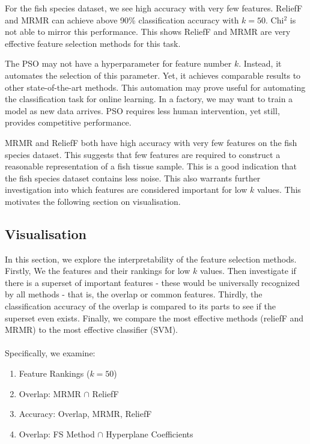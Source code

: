 \documentclass[runningheads]{llncs}
\begin{document}
For the fish species dataset, we see high accuracy with very few features.
ReliefF and MRMR can achieve above 90\% classification accuracy with $k = 50$.
Chi$^2$ is not able to mirror this performance.
This shows ReliefF and MRMR are very effective feature selection methods for this task.

The PSO may not have a hyperparameter for feature number $k$.
Instead, it automates the selection of this parameter.
Yet, it achieves comparable results to other state-of-the-art methods.
This automation may prove useful for automating the classification task for online learning.
In a factory, we may want to train a model as new data arrives.
PSO requires less human intervention, yet still, provides competitive performance.

MRMR and ReliefF both have high accuracy with very few features on the fish species dataset.
This suggests that few features are required to construct a reasonable representation of a fish tissue sample.
This is a good indication that the fish species dataset contains less noise.
This also warrants further investigation into which features are considered important for low $k$ values.
This motivates the following section on visualisation.

\subsection{Visualisation}
\label{sec:results-visualisation}

In this section, we explore the interpretability of the feature selection methods.
Firstly, We the features and their rankings for low $k$ values.
Then investigate if there is a superset of important features - these would be universally recognized by all methods - that is, the overlap or common features.
Thirdly, the classification accuracy of the overlap is compared to its parts to see if the superset even exists.
Finally, we compare the most effective methods (reliefF and MRMR) to the most effective classifier (SVM).
\\\\
Specifically, we examine:

\begin{enumerate}
  \item Feature Rankings ($k = 50$)
  \item Overlap: MRMR $\cap$ ReliefF
  \item Accuracy: Overlap, MRMR, ReliefF
  \item Overlap: FS Method $\cap$ Hyperplane Coefficients
\end{enumerate}
\end{document}
